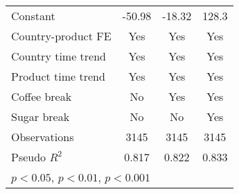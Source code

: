 \begin{table}[htbp]
\begin{tabular}{l*{3}{c}}
Constant            &      -50.98\sym{***}&      -18.32         &       128.3         \\
Country-product FE  &         Yes         &         Yes         &         Yes         \\
Country time trend  &         Yes         &         Yes         &         Yes         \\
Product time trend  &         Yes         &         Yes         &         Yes         \\
Coffee break        &          No         &         Yes         &         Yes         \\
Sugar break         &          No         &          No         &         Yes         \\
\hline
Observations        &        3145         &        3145         &        3145         \\
Pseudo \(R^{2}\)    &       0.817         &       0.822         &       0.833         \\
\hline\hline
\multicolumn{4}{l}{\footnotesize \sym{*} \(p<0.05\), \sym{**} \(p<0.01\), \sym{***} \(p<0.001\)}\\
\end{tabular}
\end{table}
